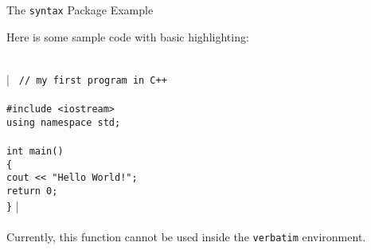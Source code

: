 \documentclass{article}
\begin{document}
\begin{center} \Large The {\tt syntax} Package Example\end{center}
\noindent Here is some sample code with basic highlighting:\\
\\

\newcommand{\tab}{\hspace*{0.5in}}

\syntax| {\tt
\noindent // my first program in C++\\
\\
\#include <iostream>\\
using namespace std;\\
\\
int main()\\
\{\\
  cout << "Hello World!";\\
  return 0;\\
\}}
|
\\
\\
Currently, this function cannot be used inside the \verb|verbatim| environment.
\end{document}
